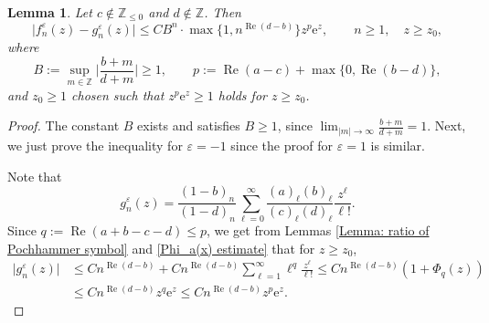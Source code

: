 \documentclass[pdftex]{sigma}
\numberwithin{equation}{section}
\newtheorem{Lemma}[Theorem]{Lemma}
\newcommand{\ZZ}{\ensuremath{\mathbb{Z}}}
\newcommand{\me}{\mathrm{e}}
\begin{document}
\begin{Lemma}\label{Lemma f_n-g_n estimate}
	Let $c\notin\ZZ_{\leqslant 0}$ and $d\notin\ZZ$. Then
	\begin{equation}\label{f_n-g_n upper bound}
		\bigl|f_n^{\varepsilon}(z)-g_n^{\varepsilon}(z)\bigr|\leqslant CB^n\cdot\max\bigl\{1,n^{\operatorname{Re}(d-b)}\bigr\}z^p\me^z,\qquad n\geqslant 1,\quad z\geqslant z_0,
	\end{equation}
	where
	\[B:=\sup_{m\in\ZZ}\biggl|\frac{b+m}{d+m}\biggr|\geqslant 1,\qquad p:=\operatorname{Re}(a-c)+\max\{0,\operatorname{Re}(b-d)\},\]
	and $z_0\geqslant 1$ chosen such that $z^p\me^z\geqslant 1$ holds for $z\geqslant z_0$.
\end{Lemma}

\begin{proof}
	The constant $B$ exists and satisfies $B\geqslant 1$, since $\lim_{|m|\to\infty}\frac{b+m}{d+m}=1$. Next, we just prove the inequality for $\varepsilon=-1$ since the proof for $\varepsilon=1$ is similar.
	
	Note that
	\[g_n^{\varepsilon}(z)=\frac{(1-b)_n}{(1-d)_n}\sum_{\ell=0}^{\infty}\frac{(a)_\ell(b)_\ell}{(c)_\ell(d)_\ell}\frac{z^{\ell}}{\ell!}.\]
	Since $q:=\operatorname{Re}(a+b-c-d)\leqslant p$, we get from Lemmas \ref{Lemma: ratio of Pochhammer symbol} and \ref{Phi_a(x) estimate} that for $z\geqslant z_0$,
	\begin{align}
		\bigl|g_n^{\varepsilon}(z)\bigr|&{} \leqslant Cn^{\operatorname{Re}(d-b)}+Cn^{\operatorname{Re}(d-b)}\sum_{\ell=1}^{\infty}\ell^{q}\frac{z^\ell}{\ell!}\leqslant Cn^{\operatorname{Re}(d-b)}(1+\Phi_q(z))\nonumber\\
		&{} \leqslant Cn^{\operatorname{Re}(d-b)}z^q\me^z\leqslant Cn^{\operatorname{Re}(d-b)}z^p\me^z.\label{g_n(z) upper bound}
	\end{align}
	

\end{proof}
\end{document}
